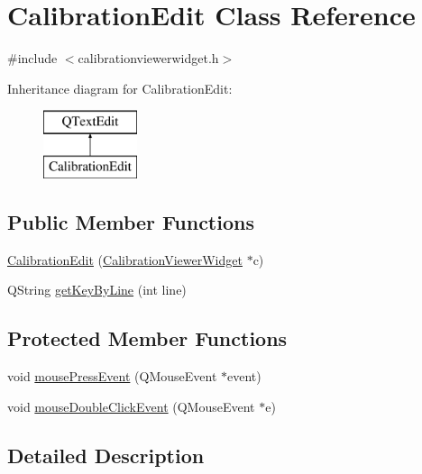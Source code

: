 \hypertarget{class_calibration_edit}{}\section{Calibration\+Edit Class Reference}
\label{class_calibration_edit}


{\ttfamily \#include $<$calibrationviewerwidget.\+h$>$}

Inheritance diagram for Calibration\+Edit\+:\begin{figure}[H]
\begin{center}
\leavevmode
\includegraphics[height=2.000000cm]{class_calibration_edit}
\end{center}
\end{figure}
\subsection*{Public Member Functions}
\begin{DoxyCompactItemize}
\item 
\mbox{\hyperlink{class_calibration_edit_afe3051dfc66a40ffbfb07c9533e4fa4e}{Calibration\+Edit}} (\mbox{\hyperlink{class_calibration_viewer_widget}{Calibration\+Viewer\+Widget}} $\ast$c)
\item 
Q\+String \mbox{\hyperlink{class_calibration_edit_a07eb45b334b8c6b717fe40073d15f7b8}{get\+Key\+By\+Line}} (int line)
\end{DoxyCompactItemize}
\subsection*{Protected Member Functions}
\begin{DoxyCompactItemize}
\item 
void \mbox{\hyperlink{class_calibration_edit_a5a5a88a27100cdfe013c563094d8f7ec}{mouse\+Press\+Event}} (Q\+Mouse\+Event $\ast$event)
\item 
void \mbox{\hyperlink{class_calibration_edit_a08cd4e543314c6abea69dfa7f32c74eb}{mouse\+Double\+Click\+Event}} (Q\+Mouse\+Event $\ast$e)
\end{DoxyCompactItemize}


\subsection{Detailed Description}


